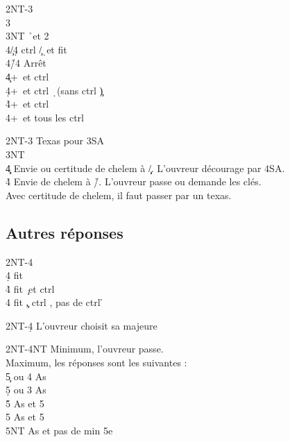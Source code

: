 \documentclass[a4paper]{article}
\begin{document}
\begin{bidtable}
2NT-3\h\\
3\s {}\s \\
3NT \h\ et 2\s \+\\
4\c/4\d \> ctrl \c /\d\ et fit \h \\
4\h/4\s \> Arrêt\-\\
4\c {}+\s\ et ctrl \c \\
4\d {}+\s\ et ctrl \d\ (sans ctrl \c )\\
4\h {}+\s\ et ctrl \h \\
4\s {}+\s\ et tous les ctrl
\end{bidtable}

\begin{bidtable}
2NT-3\s \> Texas pour 3SA\\
3NT\+\\
4\c\d \> Envie ou certitude de chelem à \c /\d . L'ouvreur décourage par 4SA.\\
4\h\s \> Envie de chelem à \h /\s . L'ouvreur passe ou demande les clés.\+\\
Avec \> certitude de chelem, il faut passer par un texas.\-\-
\end{bidtable}

\subsection{Autres réponses}

\begin{bidtable}
2NT-4\c\\
4\d \> fit \d \\
4\h \> fit \c\ et ctrl \h \\
4\s \> fit \c , ctrl \s , pas de ctrl \h 
\end{bidtable}

\begin{bidtable}
2NT-4\d \> L'ouvreur choisit sa majeure
\end{bidtable}

\begin{bidtable}
2NT-4NT \> Minimum, l'ouvreur passe.\+\\
Maximum, \> les réponses sont les suivantes :\-\\
5\c {} ou 4 As\\
5\d {} ou 3 As\\
5\h {} As et 5\c \\
5\s {} As et 5\d \\
5NT  As et pas de min 5e
\end{bidtable}
\end{document}
